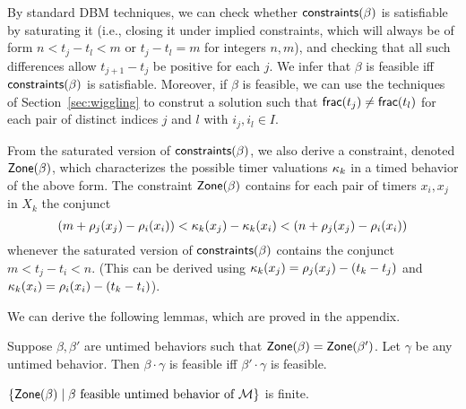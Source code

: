 By standard DBM techniques, we can check whether $\mathsf{constraints}({\beta})$ is satisfiable by saturating it (i.e., closing it under implied constraints, which
will always be of form
$n < t_j - t_l < m$ or $t_j - t_l = m$ for integers $n,m$), and checking that
all such differences allow $t_{j+1} - t_j$ be positive for each $j$.
We infer that $\beta$ is feasible iff $\mathsf{constraints}({\beta})$ is satisfiable.
Moreover, if $\beta$ is feasible, we can use the techniques of
Section~\ref{sec:wiggling} to construt a solution
such that $\mathsf{frac}({t_j}) \neq \mathsf{frac}({t_l})$ for each pair of distinct indices $j$ and $l$ with $i_j, i_l \in I$.

From the saturated version of $\mathsf{constraints}({\beta})$, we also derive a constraint,
denoted $\mathsf{Zone}({\beta})$,
which characterizes the possible timer valuations $\kappa_k$ in a timed
behavior of the above form.  The constraint $\mathsf{Zone}({\beta})$
contains for each pair of timers $x_i,x_j$ in $X_k$ the conjunct
\[
(m + \rho_j(x_j) - \rho_i(x_i)) < \kappa_k(x_j) -\kappa_k(x_i) < (n + \rho_j(x_j) - \rho_i(x_i))
\]
whenever the saturated version of $\mathsf{constraints}({\beta})$ contains the conjunct
\(
m < t_j - t_i < n
\).
(This can be derived using
$\kappa_k(x_j) = \rho_j(x_j) - (t_k - t_j)$
and
$\kappa_k(x_i) = \rho_i(x_i) - (t_k - t_i)$).

We can derive the following lemmas, which are proved in the appendix.

\begin{lemma}
\label{lemma: feasibility concatenation}
Suppose $\beta, \beta'$ are untimed behaviors such that
$\mathsf{Zone}({\beta}) = \mathsf{Zone}({\beta'})$. Let $\gamma$ be any untimed behavior.
Then $\beta \cdot \gamma$ is feasible iff $\beta' \cdot \gamma$ is feasible.
\end{lemma}

\begin{lemma}
\label{lemma finitely many zones}
$\{ \mathsf{Zone}({\beta}) \mid \beta \mbox{ feasible untimed behavior of } {\mathcal M} \}$ is finite.
\end{lemma}

